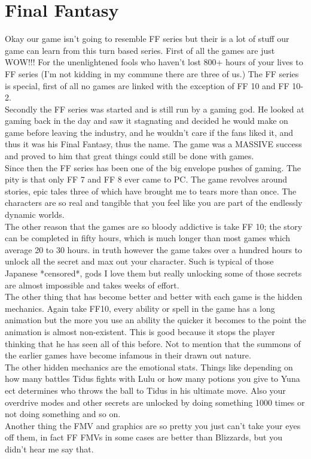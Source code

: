 \documentclass[a4paper]{article}
\begin{document}
\section{Final Fantasy}
Okay our game isn't going to resemble FF series but their is a lot of stuff our game can learn from this turn based series. First of all the games are just WOW!!! For the unenlightened fools who haven't lost 800+ hours of your lives to FF series (I'm not kidding in my commune there are three of us.) The FF series is special, first of all no games are linked with the exception of FF 10 and FF 10-2.\\
Secondly the FF series was started and is still run by a gaming god. He looked at gaming back in the day and saw it stagnating and decided he would make on game before leaving the industry, and he wouldn't care if the fans liked it, and thus it was his Final Fantasy, thus the name. The game was a MASSIVE success and proved to him that great things could still be done with games.\\
Since then the FF series has been one of the big envelope pushes of gaming. The pity is that only FF 7 and FF 8 ever came to PC. The game revolves around stories, epic tales three of which have brought me to tears more than once. The characters are so real and tangible that you feel like you are part of the endlessly dynamic worlds.\\
The other reason that the games are so bloody addictive is take FF 10; the story can be completed in fifty hours, which is much longer than most games which average 20 to 30 hours. in truth however the game takes over a hundred hours to unlock all the secret and max out your character. Such is typical of those Japanese *censored*, gods I love them but really unlocking some of those secrets are almost impossible and takes weeks of effort.\\
The other thing that has become better and better with each game is the hidden mechanics. Again take FF10, every ability or spell in the game has a long animation but the more you use an ability the quicker it becomes to the point the animation is almost non-existent. This is good because it stops the player thinking that he has seen all of this before. Not to mention that the summons of the earlier games have become infamous in their drawn out nature.\\
The other hidden mechanics are the emotional stats. Things like depending on how many battles Tidus fights with Lulu or how many potions you give to Yuna ect determines who throws the ball to Tidus in his ultimate move. Also your overdrive modes and other secrets are unlocked by doing something 1000 times or not doing something and so on.\\
Another thing the FMV and graphics are so pretty you just can't take your eyes off them, in fact FF FMVs in some cases are better than Blizzards, but you didn't hear me say that.
\end{document}
